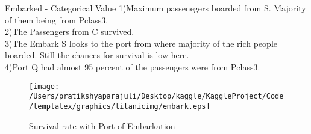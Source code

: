 \documentclass[
 size=14pt,
 paper=smartboard,  %
 mode=present, 		%
 display=slides, 	%
 style=tuliplab,  	%
 pauseslide,
 fleqn,leqno]{powerdot}
\begin{document}
\begin{slide}[toc=,bm=]{Embarked - Categorical Value}
  1)Maximum passenegers boarded from S. Majority of them being from Pclass3.\\
2)The Passengers from C survived. \\
3)The Embark S looks to the port from where majority of the rich people boarded. Still the chances for survival is low here.\\
4)Port Q had almost 95 percent of the passengers were from Pclass3.
\vspace{0.1cm}
\begin{figure}
  \centering
  \centerline{
    \texttt{[image: /Users/pratikshyaparajuli/Desktop/kaggle/KaggleProject/Code/templatex/graphics/titanicimg/embark.eps]}
    }
  \caption{Survival rate with Port of Embarkation}\label{fig:embark}
\end{figure}

\end{slide}
\end{document}
